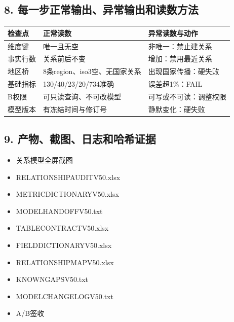 \documentclass[UTF8,openany,zihao=-4]{ctexbook}
\renewcommand{\_}{\textunderscore\allowbreak}
\begin{document}
\subsection*{8. 每一步正常输出、异常输出和读数方法}
\noindent\begin{tabularx}{\textwidth}{@{}p{}XX@{}}
\toprule
\textbf{检查点} & \textbf{正常读数} & \textbf{异常读数与动作} \\
\midrule
维度键 & 唯一且无空 & 非唯一：禁止建关系 \\
事实行数 & 关系前后不变 & 增加：禁用最近关系 \\
地区桥 & 8条region、iso3空、无国家关系 & 出现国家传播：硬失败 \\
基础指标 & 130/40/23/20/734准确 & 误差超1\%：FAIL \\
B权限 & 可只读查询、不可改模型 & 可写或不可读：调整权限 \\
模型版本 & 有冻结时间与修订号 & 静默变化：硬失败 \\
\bottomrule
\end{tabularx}

\subsection*{9. 产物、截图、日志和哈希证据}
\begin{itemize}[label=$\square$]
\item 关系模型全屏截图
\item RELATIONSHIP\_AUDIT\_V50.xlsx
\item METRIC\_DICTIONARY\_V50.xlsx
\item MODEL\_HANDOFF\_V50.txt
\item TABLE\_CONTRACT\_V50.xlsx
\item FIELD\_DICTIONARY\_V50.xlsx
\item RELATIONSHIP\_MAP\_V50.xlsx
\item KNOWN\_GAPS\_V50.txt
\item MODEL\_CHANGELOG\_V50.txt
\item A/B签收
\end{itemize}
\end{document}
